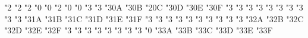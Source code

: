 \mathchardef \boxdot   "2
\mathchardef \boxplus   "2
\mathchardef \boxtimes   "2
\mathchardef \square   "0
\mathchardef \blacksquare   "0
\mathchardef \centerdot   "2
\mathchardef \lozenge   "0
\mathchardef \blacklozenge   "0
\mathchardef \circlearrowright   "3
\mathchardef \circlearrowleft   "3
\mathchardef \rightleftharpoons   "3\amsafam 0A
\mathchardef \leftrightharpoons   "3\amsafam 0B
\mathchardef \boxminus   "2\amsafam 0C
\mathchardef \Vdash   "3\amsafam 0D
\mathchardef \Vvdash   "3\amsafam 0E
\mathchardef \vDash   "3\amsafam 0F
\mathchardef \twoheadrightarrow   "3
\mathchardef \twoheadleftarrow   "3
\mathchardef \leftleftarrows   "3
\mathchardef \rightrightarrows   "3
\mathchardef \upuparrows   "3
\mathchardef \downdownarrows   "3
\mathchardef \upharpoonright   "3
\mathchardef \downharpoonright   "3
\mathchardef \upharpoonleft   "3
\mathchardef \downharpoonleft   "3
\mathchardef \rightarrowtail   "3\amsafam 1A
\mathchardef \leftarrowtail   "3\amsafam 1B
\mathchardef \leftrightarrows   "3\amsafam 1C
\mathchardef \rightleftarrows   "3\amsafam 1D
\mathchardef \Lsh   "3\amsafam 1E
\mathchardef \Rsh   "3\amsafam 1F
\mathchardef \rightsquigarrow   "3
\mathchardef \leftrightsquigarrow   "3
\mathchardef \looparrowleft   "3
\mathchardef \looparrowright   "3
\mathchardef \circeq   "3
\mathchardef \succsim   "3
\mathchardef \gtrsim   "3
\mathchardef \gtrapprox   "3
\mathchardef \multimap   "3
\mathchardef \therefore   "3
\mathchardef \because   "3\amsafam 2A
\mathchardef \doteqdot   "3\amsafam 2B
\mathchardef \triangleq   "3\amsafam 2C
\mathchardef \precsim   "3\amsafam 2D
\mathchardef \lesssim   "3\amsafam 2E
\mathchardef \lessapprox   "3\amsafam 2F
\mathchardef \eqslantless   "3
\mathchardef \eqslantgtr   "3
\mathchardef \curlyeqprec   "3
\mathchardef \curlyeqsucc   "3
\mathchardef \preccurlyeq   "3
\mathchardef \leqq   "3
\mathchardef \leqslant   "3
\mathchardef \lessgtr   "3
\mathchardef \backprime   "0
\mathchardef \risingdotseq   "3\amsafam 3A
\mathchardef \fallingdotseq   "3\amsafam 3B
\mathchardef \succcurlyeq   "3\amsafam 3C
\mathchardef \geqq   "3\amsafam 3D
\mathchardef \geqslant   "3\amsafam 3E
\mathchardef \gtrless   "3\amsafam 3F
